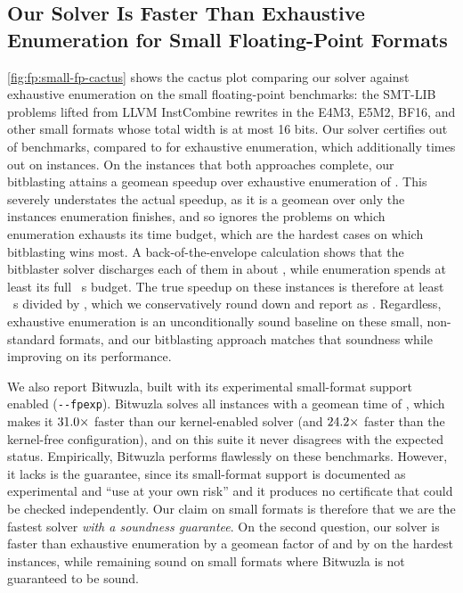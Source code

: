 \subsection{Our Solver Is Faster Than Exhaustive Enumeration for Small Floating-Point Formats}

\cref{fig:fp:small-fp-cactus} shows the cactus plot comparing our solver
against exhaustive enumeration on the small floating-point benchmarks:
the \SmallFpNumTotal{} SMT-LIB problems lifted from LLVM InstCombine rewrites
in the E4M3, E5M2, BF16, and other small formats whose total width is at most 16 bits.
Our solver certifies \SmallFpNumSolvedOurs{} out of \SmallFpNumTotal{} benchmarks,
compared to \SmallFpNumSolvedNaive{} for exhaustive enumeration,
which additionally times out on \SmallFpNaiveTimeouts{} instances.
On the instances that both approaches complete, our bitblasting attains a
geomean speedup over exhaustive enumeration of \SmallFpTimeElapsedRatioON{}.
This severely understates the actual speedup,
as it is a geomean over only the instances enumeration finishes, and so ignores the \SmallFpNaiveTimeouts{} problems on which enumeration exhausts its
time budget, which are the hardest cases on which bitblasting wins most.
A back-of-the-envelope calculation shows that
the bitblaster solver discharges each of them in about \SmallFpGeomeanTimeFpLean{}, while enumeration
spends at least its full \FpConfigTimeoutSec{}~s budget.
The true speedup on these instances is therefore at least \FpConfigTimeoutSec{}~s
divided by \SmallFpGeomeanTimeFpLean{}, which we conservatively round down and report as \SmallFpTimeoutSpeedupLB{}.
Regardless, exhaustive enumeration is an unconditionally sound baseline on these small,
non-standard formats, and our bitblasting approach matches that soundness while improving on its performance.

We also report Bitwuzla, built with its experimental small-format support enabled (\texttt{-{}-fpexp}).
Bitwuzla solves all \InstcombineSmallNumSolvedBitwuzla{} instances with a geomean time of
\InstcombineSmallGeomeanTimeBitwuzla{}, which makes it
$31.0\times$ faster than our kernel-enabled solver
(and $24.2\times$ faster than the kernel-free configuration),
and on this suite it never disagrees with the expected status.
Empirically, Bitwuzla performs flawlessly on these benchmarks.
However, it lacks is the guarantee, since its small-format support is documented as experimental and ``use at your own risk''
and it produces no certificate that could be checked independently.
Our claim on small formats is therefore that we are the fastest solver \emph{with a soundness guarantee}.
On the second question, our solver is faster than exhaustive enumeration by a geomean factor of \SmallFpTimeElapsedRatioON{} and by \SmallFpTimeoutSpeedupLB{} on the hardest instances,
while remaining sound on small formats where Bitwuzla is not guaranteed to be sound.

